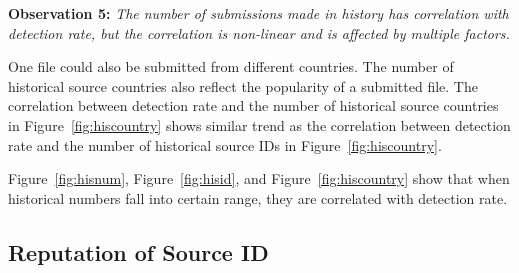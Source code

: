 

{\bf Observation 5:} 
{\em The number of submissions made in history has correlation with detection rate, but the correlation is non-linear and is affected by multiple factors.}

One file could also be submitted from different countries. 
The number of historical source countries also reflect the popularity of a submitted file. 
The correlation between detection rate and the number of historical source countries in 
Figure~\ref{fig:hiscountry} shows similar trend as the correlation between detection rate 
and the number of historical source IDs in Figure~\ref{fig:hiscountry}. 

Figure~\ref{fig:hisnum}, Figure~\ref{fig:hisid}, and Figure~\ref{fig:hiscountry} show that 
when historical numbers fall into certain range, they are correlated with detection rate. 
\fi

\subsection{Reputation of Source ID}
\label{sec:reputation}

